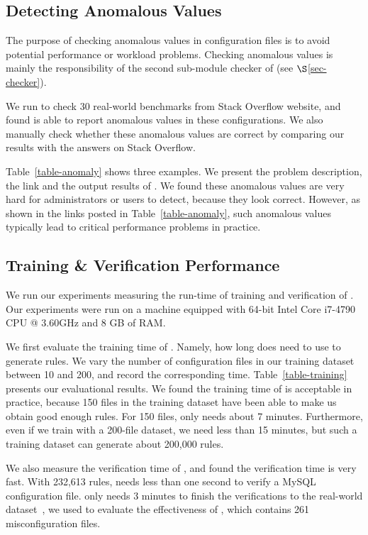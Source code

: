 \subsection{Detecting Anomalous Values}
\label{subsec-anomalous}

The purpose of checking anomalous values in configuration files 
is to avoid potential performance or workload problems. 
Checking anomalous values is mainly the responsibility of
the second sub-module checker of \app (see $\S$\ref{sec-checker}).

We run \app to check 30 real-world benchmarks from Stack Overflow 
website, and found \app is able to report anomalous values in
these configurations. We also manually check whether these
anomalous values are correct by comparing our results with
the answers on Stack Overflow.

Table~\ref{table-anomaly} shows three examples.
We present the problem description, the link and the output results
of \app. We found these anomalous values are very hard for
administrators or users to detect, because they look correct.
However, as shown in the links posted in Table~\ref{table-anomaly},
such anomalous values typically lead to critical performance
problems in practice.

\subsection{Training \& Verification Performance}
\label{subsec-time}

We run our experiments measuring the run-time of training and
verification of \app.
Our experiments were run on a machine equipped with
64-bit Intel Core i7-4790 CPU @ 3.60GHz and 8 GB of RAM.

We first evaluate the training time of \app. Namely, how long
does \app need to use to generate rules.
We vary the number of configuration files in our training dataset
between 10 and 200, and record the corresponding time.
Table~\ref{table-training} presents our evaluational results.
We found the training time of \app is acceptable in practice,
because 150 files in the training dataset have been able to make
us obtain good enough rules.
For 150 files, \app only needs about 7 minutes.
Furthermore, even if we train \app with a 200-file dataset,
we need less than 15 minutes, but such a training dataset
can generate about 200,000 rules.

We also measure the verification time of \app, and found
the verification time is very fast. With 232,613 rules,
\app needs less than one second to verify a MySQL configuration file.
\app only needs 3 minutes to finish the verifications to
the real-world dataset~\cite{configdataset}, we used to 
evaluate the effectiveness of \app,
which contains 261 misconfiguration files. 

